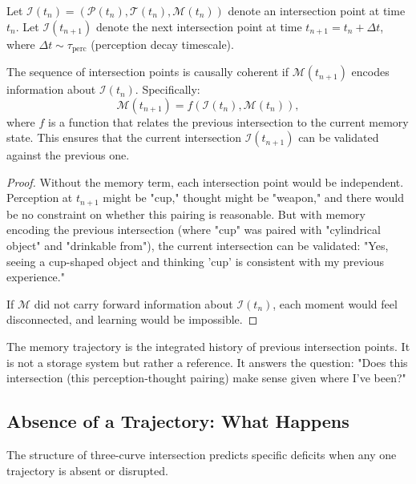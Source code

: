 \begin{theorem}
\label{thm:coherence}
Let $\mathcal{I}(t_n) = (\mathcal{P}(t_n), \mathcal{T}(t_n), \mathcal{M}(t_n))$ denote an intersection point at time $t_n$. Let $\mathcal{I}(t_{n+1})$ denote the next intersection point at time $t_{n+1} = t_n + \Delta t$, where $\Delta t \sim \tau_{\text{perc}}$ (perception decay timescale).

The sequence of intersection points is causally coherent if $\mathcal{M}(t_{n+1})$ encodes information about $\mathcal{I}(t_n)$. Specifically:
\begin{equation}
\mathcal{M}(t_{n+1}) = f(\mathcal{I}(t_n), \mathcal{M}(t_n)),
\end{equation}
where $f$ is a function that relates the previous intersection to the current memory state. This ensures that the current intersection $\mathcal{I}(t_{n+1})$ can be validated against the previous one.
\end{theorem}

\begin{proof}
Without the memory term, each intersection point would be independent. Perception at $t_{n+1}$ might be "cup," thought might be "weapon," and there would be no constraint on whether this pairing is reasonable. But with memory encoding the previous intersection (where "cup" was paired with "cylindrical object" and "drinkable from"), the current intersection can be validated: "Yes, seeing a cup-shaped object and thinking 'cup' is consistent with my previous experience."

If $\mathcal{M}$ did not carry forward information about $\mathcal{I}(t_n)$, each moment would feel disconnected, and learning would be impossible.
\end{proof}

\begin{corollary}
The memory trajectory is the integrated history of previous intersection points. It is not a storage system but rather a reference. It answers the question: "Does this intersection (this perception-thought pairing) make sense given where I've been?"
\end{corollary}

\subsection{Absence of a Trajectory: What Happens}

The structure of three-curve intersection predicts specific deficits when any one trajectory is absent or disrupted.


